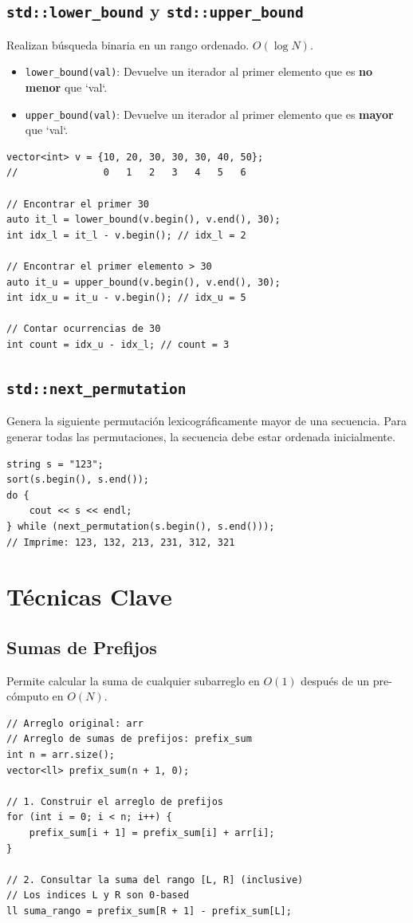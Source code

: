 \documentclass[11pt, a4paper]{article}
\begin{document}
\subsection{\texttt{std::lower\_bound} y \texttt{std::upper\_bound}}
Realizan búsqueda binaria en un rango ordenado. $O(\log N)$.
\begin{itemize}
	\item \texttt{lower\_bound(val)}: Devuelve un iterador al primer elemento que es \textbf{no menor} que `val`.
	\item \texttt{upper\_bound(val)}: Devuelve un iterador al primer elemento que es \textbf{mayor} que `val`.
\end{itemize}
\begin{lstlisting}
vector<int> v = {10, 20, 30, 30, 30, 40, 50};
//               0   1   2   3   4   5   6

// Encontrar el primer 30
auto it_l = lower_bound(v.begin(), v.end(), 30);
int idx_l = it_l - v.begin(); // idx_l = 2

// Encontrar el primer elemento > 30
auto it_u = upper_bound(v.begin(), v.end(), 30);
int idx_u = it_u - v.begin(); // idx_u = 5

// Contar ocurrencias de 30
int count = idx_u - idx_l; // count = 3
\end{lstlisting}

\subsection{\texttt{std::next\_permutation}}
Genera la siguiente permutación lexicográficamente mayor de una secuencia. Para generar todas las permutaciones, la secuencia debe estar ordenada inicialmente.
\begin{lstlisting}
string s = "123";
sort(s.begin(), s.end());
do {
    cout << s << endl;
} while (next_permutation(s.begin(), s.end()));
// Imprime: 123, 132, 213, 231, 312, 321
\end{lstlisting}

\section{Técnicas Clave}

\subsection{Sumas de Prefijos}
Permite calcular la suma de cualquier subarreglo en $O(1)$ después de un pre-cómputo en $O(N)$.
\begin{lstlisting}
// Arreglo original: arr
// Arreglo de sumas de prefijos: prefix_sum
int n = arr.size();
vector<ll> prefix_sum(n + 1, 0);

// 1. Construir el arreglo de prefijos
for (int i = 0; i < n; i++) {
    prefix_sum[i + 1] = prefix_sum[i] + arr[i];
}

// 2. Consultar la suma del rango [L, R] (inclusive)
// Los indices L y R son 0-based
ll suma_rango = prefix_sum[R + 1] - prefix_sum[L];
\end{lstlisting}
\end{document}
